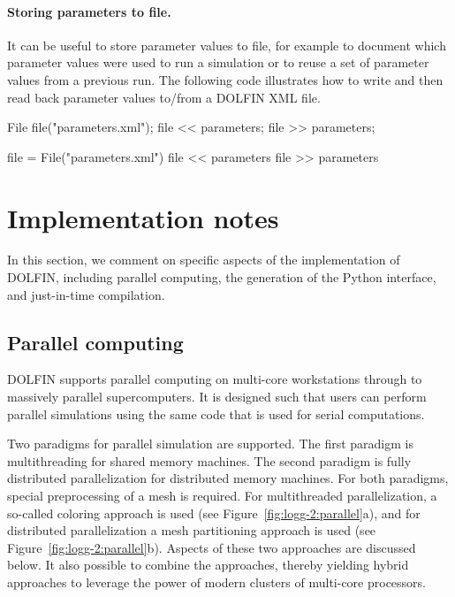 \paragraph{Storing parameters to file.}

It can be useful to store parameter values to file, for example to
document which parameter values were used to run a simulation or to
reuse a set of parameter values from a previous run. The following code
illustrates how to write and then read back parameter values to/from a
DOLFIN XML file.
\begin{python}
File file("parameters.xml");
file << parameters;
file >> parameters;
\end{python}
\begin{c++}
file = File("parameters.xml")
file << parameters
file >> parameters
\end{c++}

\section{Implementation notes}
\label{sec:logg-2:implementation}

In this section, we comment on specific aspects of the implementation
of DOLFIN, including parallel computing, the generation of the Python
interface, and just-in-time compilation.

\subsection{Parallel computing}

DOLFIN supports parallel computing on multi-core workstations through
to massively parallel supercomputers. It is designed such that users
can perform parallel simulations using the same code that is used for
serial computations.

Two paradigms for parallel simulation are supported.  The first
paradigm is multithreading for shared memory machines.  The second
paradigm is fully distributed parallelization for distributed memory
machines. For both paradigms, special preprocessing of a mesh is
required.  For multithreaded parallelization, a so-called coloring
approach is used (see Figure~\ref{fig:logg-2:parallel}a), and for
distributed parallelization a mesh partitioning approach is used (see
Figure~\ref{fig:logg-2:parallel}b). Aspects of these two approaches are
discussed below.  It also possible to combine the approaches, thereby
yielding hybrid approaches to leverage the power of modern clusters of
multi-core processors.

